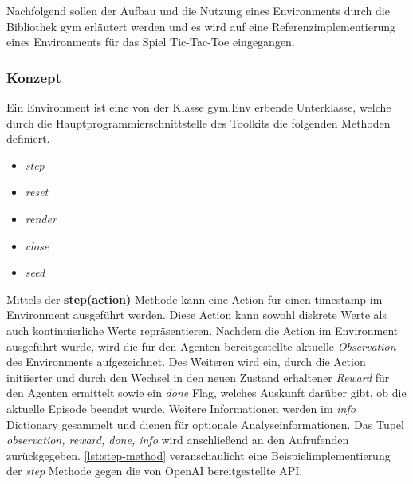 \documentclass[11pt]{scrartcl}
\begin{document}
Nachfolgend sollen der Aufbau und die Nutzung eines Environments durch die Bibliothek gym
erläutert werden und es wird auf eine Referenzimplementierung eines Environments für das
Spiel Tic-Tac-Toe eingegangen.

\subsubsection{Konzept}
Ein Environment ist eine von der Klasse gym.Env erbende Unterklasse, welche durch die
Hauptprogrammierschnittstelle des Toolkits die folgenden Methoden definiert.

\begin{itemize}
\itemsep-6pt
\item \textit{step}
\item \textit{reset}
\item \textit{render}
\item \textit{close}
\item \textit{seed}
\end{itemize}  

Mittels der \textbf{step(action)} Methode kann eine Action für einen timestamp im
Environment ausgeführt werden. Diese Action kann sowohl diskrete Werte als auch 
kontinuierliche Werte repräsentieren. Nachdem die Action im Environment ausgeführt wurde,
wird die für den Agenten bereitgestellte aktuelle \textit{Observation} des Environments
aufgezeichnet. Des Weiteren wird ein, durch die Action initiierter und durch den Wechsel
in den neuen Zustand erhaltener \textit{Reward} für den Agenten ermittelt sowie ein 
\textit{done} Flag, welches Auskunft darüber gibt, ob die aktuelle Episode beendet wurde.
Weitere Informationen werden im \textit{info} Dictionary gesammelt und dienen für optionale
Analyseinformationen. Das Tupel \textit{observation, reward, done, info} wird anschließend
an den Aufrufenden zurückgegeben. \autoref{lst:step-method} veranschaulicht eine
Beispielimplementierung der \textit{step} Methode gegen die von OpenAI bereitgestellte API.
\end{document}
